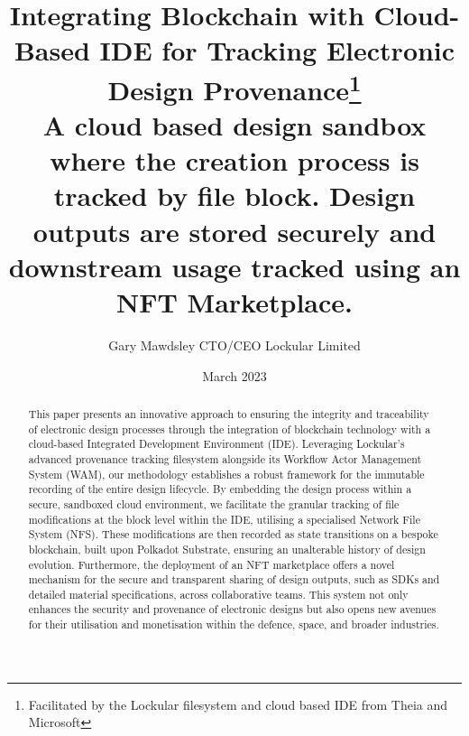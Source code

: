 \documentclass{tufte-handout}
\title{Integrating Blockchain with Cloud-Based IDE for Tracking Electronic Design Provenance\thanks{Facilitated by the Lockular filesystem and cloud based IDE from Theia and Microsoft} \\
\large A cloud based design sandbox where the creation process is tracked by file block. Design outputs are stored securely and downstream usage tracked using an NFT Marketplace.}
\author[Gary Mawdsley]{Gary Mawdsley CTO/CEO Lockular Limited}
\date{March 2023}  %
\begin{document}
\maketitle%

\begin{abstract}
\noindent 
This paper presents an innovative approach to ensuring the integrity and traceability of electronic design processes through the integration of blockchain technology
with a cloud-based Integrated Development Environment (IDE). Leveraging Lockular's advanced provenance tracking filesystem alongside its Workflow Actor Management System (WAM),
our methodology establishes a robust framework for the immutable recording of the entire design lifecycle. By embedding the design process within a secure, sandboxed
cloud environment, we facilitate the granular tracking of file modifications at the block level within the IDE, utilising a specialised Network File System (NFS).
These modifications are then recorded as state transitions on a bespoke blockchain, built upon Polkadot Substrate, ensuring an unalterable history of design
evolution. Furthermore, the deployment of an NFT marketplace offers a novel mechanism for the secure and transparent sharing of design outputs, such as SDKs and
detailed material specifications, across collaborative teams. This system not only enhances the security and provenance of electronic
designs but also opens new avenues for their utilisation and monetisation within the defence, space, and broader industries.

\end{abstract}

{}
\end{document}
